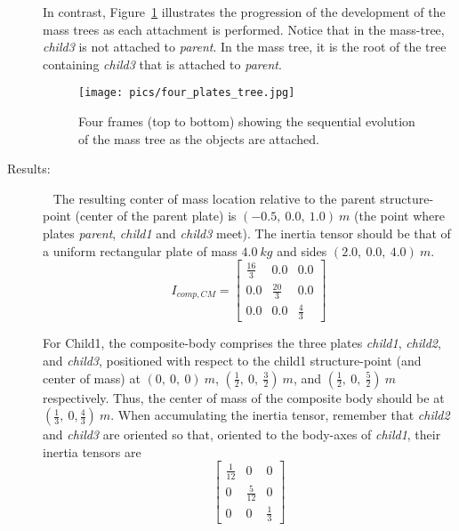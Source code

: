 \begin{description}
In contrast, Figure~\ref{fig:four_plates_tree} illustrates the progression of
the development of the mass trees as each attachment is performed.  Notice
that in the mass-tree, \textit{child3} is not attached to \textit{parent}.
In the mass tree, it is the root of the tree containing
\textit{child3} that is attached to \textit{parent}.

\begin{figure}[h]
\begin{center}
\texttt{[image: pics/four\_plates\_tree.jpg]}
\caption[Mass Tree Evolution]
{Four frames (top to bottom) showing the sequential evolution of the
mass tree as the objects are attached.}
\label{fig:four_plates_tree}
\end{center}
\end{figure}

\item[Results:]\ \newline
The resulting conter of mass location relative to the parent structure-point
(center of the parent plate) is $(-0.5,~0.0,~1.0)~m$ (the point where plates
\textit{parent}, \textit{child1} and \textit{child3} meet).
The inertia tensor should be that of a uniform rectangular plate of mass
$4.0~kg$ and sides $(2.0,~0.0,~4.0)~m$.
\begin{equation*}
I_{comp,CM} =
   \begin{bmatrix} \frac{16}{3} & 0.0   & 0.0  \\
                   0.0   & \frac{20}{3} & 0.0   \\
                    0.0  & 0.0   & \frac{4}{3}
   \end{bmatrix}
\end{equation*}

For Child1, the composite-body comprises the three plates \textit{child1},
\textit{child2}, and \textit{child3}, positioned with respect to the child1
structure-point (and center of mass) at $(0,~0,~0)~m$,
$(\frac{1}{2},~0,~\frac{3}{2})~m$, and $(\frac{1}{2},~0,~\frac{5}{2})~m$
respectively.  Thus, the center of mass of the composite body should be at
$(\frac{1}{3},~0,\frac{4}{3})~m$.  When accumulating the inertia tensor,
remember that \textit{child2} and \textit{child3} are oriented so that,
oriented to the body-axes of \textit{child1}, their inertia tensors are
\begin{equation*}
\begin{bmatrix} \frac{1}{12} & 0   & 0  \\
                   0  & \frac{5}{12} & 0   \\
                    0  & 0   & \frac{1}{3}
   \end{bmatrix}
\end{equation*}


\end{description}

